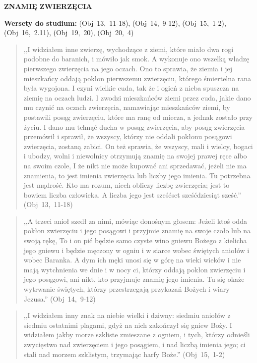 \documentclass[10pt,a4paper,oneside]{article}
\begin{document}
\centerline{\textbf{\MakeUppercase{Znamię Zwierzęcia}}}
\begin{center}
\textbf{Wersety do studium:} (Obj~13,~11-18), (Obj~14,~9-12), (Obj~15,~1-2), (Obj~16,~2.11), (Obj~19,~20), (Obj~20,~4)
\end{center}
\begin{quote}
,,I widziałem inne zwierzę, wychodzące z ziemi, które miało dwa rogi podobne do baranich, i mówiło jak smok. A wykonuje ono wszelką władzę pierwszego zwierzęcia na jego oczach. Ono to sprawia, że ziemia i jej mieszkańcy oddają pokłon pierwszemu zwierzęciu, którego śmiertelna rana była wygojona. I czyni wielkie cuda, tak że i ogień z nieba spuszcza na ziemię na oczach ludzi. I zwodzi mieszkańców ziemi przez cuda, jakie dano mu czynić na oczach zwierzęcia, namawiając mieszkańców ziemi, by postawili posąg zwierzęciu, które ma ranę od miecza, a jednak zostało przy życiu. I dano mu tchnąć ducha w posąg zwierzęcia, aby posąg zwierzęcia przemówił i sprawił, że wszyscy, którzy nie oddali pokłonu posągowi zwierzęcia, zostaną zabici. On też sprawia, że wszyscy, mali i wielcy, bogaci i ubodzy, wolni i niewolnicy otrzymują znamię na swojej prawej ręce albo na swoim czole, I że nikt nie może kupować ani sprzedawać, jeżeli nie ma znamienia, to jest imienia zwierzęcia lub liczby jego imienia. Tu potrzebna jest mądrość. Kto ma rozum, niech obliczy liczbę zwierzęcia; jest to bowiem liczba człowieka. A liczba jego jest sześćset sześćdziesiąt sześć.'' (Obj~13,~11-18)
\end{quote}
\begin{quote}
,,A trzeci anioł szedł za nimi, mówiąc donośnym głosem: Jeżeli ktoś odda pokłon zwierzęciu i jego posągowi i przyjmie znamię na swoje czoło lub na swoją rękę, To i on pić będzie samo czyste wino gniewu Bożego z kielicha jego gniewu i będzie męczony w ogniu i w siarce wobec świętych aniołów i wobec Baranka. A dym ich męki unosi się w górę na wieki wieków i nie mają wytchnienia we dnie i w nocy ci, którzy oddają pokłon zwierzęciu i jego posągowi, ani nikt, kto przyjmuje znamię jego imienia. Tu się okaże wytrwanie świętych, którzy przestrzegają przykazań Bożych i wiary Jezusa.'' (Obj~14,~9-12)
\end{quote}
\begin{quote}
,,I widziałem inny znak na niebie wielki i dziwny: siedmiu aniołów z siedmiu ostatnimi plagami, gdyż na nich zakończył się gniew Boży. I widziałem jakby morze szkliste zmieszane z ogniem, i tych, którzy odnieśli zwycięstwo nad zwierzęciem i jego posągiem, i nad liczbą imienia jego; ci stali nad morzem szklistym, trzymając harfy Boże.'' (Obj~15,~1-2)
\end{quote}
\end{document}
